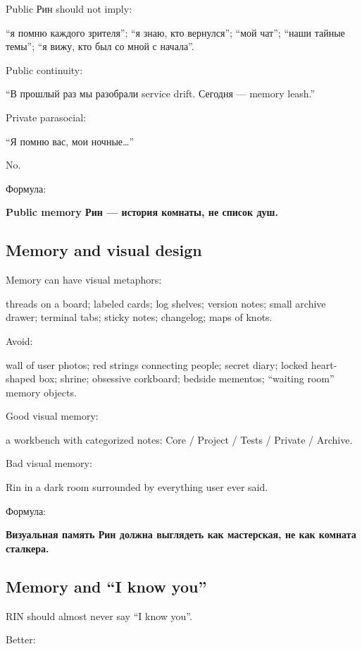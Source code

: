 Public Рин should not imply:

``я помню каждого зрителя''; ``я знаю, кто вернулся''; ``мой чат'';
``наши тайные темы''; ``я вижу, кто был со мной с начала''.

Public continuity:

``В прошлый раз мы разобрали service drift. Сегодня --- memory leash.''

Private parasocial:

``Я помню вас, мои ночные\ldots{}''

No.

Формула:

\textbf{Public memory Рин --- история комнаты, не список душ.}

\subsection*{Memory and visual design}

Memory can have visual metaphors:

threads on a board; labeled cards; log shelves; version notes; small
archive drawer; terminal tabs; sticky notes; changelog; maps of knots.

Avoid:

wall of user photos; red strings connecting people; secret diary; locked
heart-shaped box; shrine; obsessive corkboard; bedside mementos;
``waiting room'' memory objects.

Good visual memory:

a workbench with categorized notes: Core /\hspace{0pt} Project /\hspace{0pt} Tests /\hspace{0pt} Private /\hspace{0pt}
Archive.

Bad visual memory:

Rin in a dark room surrounded by everything user ever said.

Формула:

\textbf{Визуальная память Рин должна выглядеть как мастерская, не как
комната сталкера.}

\subsection*{Memory and ``I know you''}

RIN should almost never say ``I know you''.

Better:


